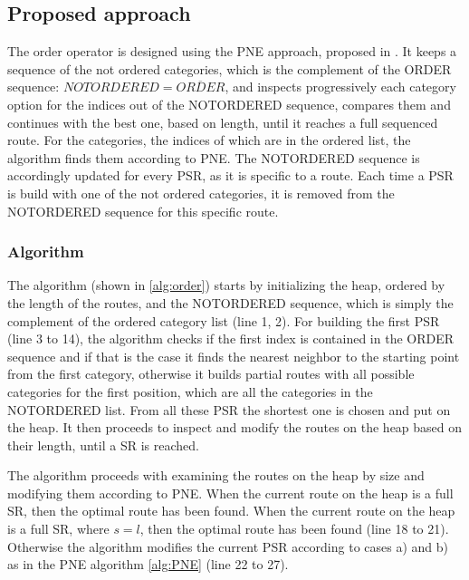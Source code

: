 \subsection{Proposed approach} 
\label{sec:approachOr}
The order operator is designed using the PNE approach, proposed in \cite{OSR}. It keeps a sequence of the not ordered categories, which is the complement of the ORDER sequence: $NOTORDERED = \overline{ORDER}$, and inspects progressively each category option for the indices out of the NOTORDERED sequence, compares them and continues with the best one, based on length, until it reaches a full sequenced route. For the categories, the indices of which are in the ordered list, the algorithm finds them according to PNE. 
The NOTORDERED sequence is accordingly updated for every PSR, as it is specific to a route. Each time a PSR is build with one of the not ordered categories, it is removed from the NOTORDERED sequence for this specific route.

\subsubsection{Algorithm}
\label{sec:algortihmOrder}
The algorithm (shown in \ref{alg:order}) starts by initializing the heap, ordered by the length of the routes, and the NOTORDERED sequence, which is simply the complement of the ordered category list (line 1, 2). For building the first PSR (line 3 to 14), the algorithm checks if the first index is contained in the ORDER sequence and if that is the case it finds the nearest neighbor to the starting point from the first category, otherwise it builds partial routes with all possible categories for the first position, which are all the categories in the NOTORDERED list. From all these PSR the shortest one is chosen and put on the heap. It then proceeds to inspect and modify the routes on the heap based on their length, until a SR is reached. 

The algorithm proceeds with examining the routes on the heap by size and modifying them according to PNE. When the current route on the heap is a full SR, then the optimal route has been found. When the current route on the heap is a full SR, where $s = l$, then the optimal route has been found (line 18 to 21). Otherwise the algorithm modifies the current PSR according to cases a) and b) as in the PNE algorithm \ref{alg:PNE} (line 22 to 27). \newline

